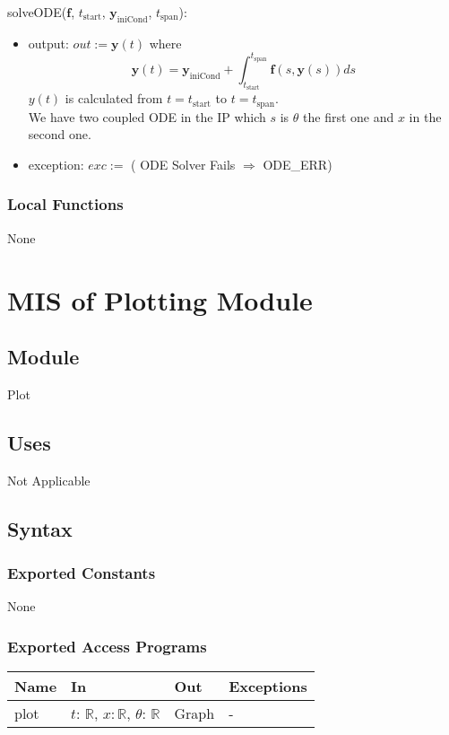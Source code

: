 \documentclass[12pt, titlepage]{article}
\begin{document}
\noindent solveODE($\textbf{f}$, $t_\text{start}$, $\textbf{y}_\text{iniCond}$, $t_\text{span}$): 
\begin{itemize}
\item output: $out := \textbf{y}(t)$ where 
$$\textbf{y}(t) = \textbf{y}_\text{iniCond} + \int_{t_\text{start}}^{t_\text{span}} \textbf{f}(s, \textbf{y}(s)) ds$$ 
$y(t)$ is calculated from $t = t_\text{start}$ to $t = t_\text{span}$.\\
We have two coupled ODE in the IP which $s$ is $\theta$ the first one and $x$ in the second one. 
\item exception: $exc :=$ ( ODE Solver Fails $\Rightarrow$ ODE\_ERR)
\end{itemize}

\subsubsection{Local Functions}
None
\newpage


\section{MIS of Plotting Module \label{MPlot}}


\subsection{Module}
Plot
\subsection{Uses}
Not Applicable

\subsection{Syntax}

\subsubsection{Exported Constants}
None
\subsubsection{Exported Access Programs}
\begin{center}
\begin{tabular}{p{2cm} p{4cm} p{2cm} p{2cm}}
\hline
\textbf{Name} & \textbf{In} & \textbf{Out} & \textbf{Exceptions} \\
\hline
plot & $t$: $\mathbb{R}$, $x$$: \mathbb{R}$, $\theta$: $\mathbb{R}$ & Graph & - \\
\hline
\end{tabular}
\end{center}
\end{document}
